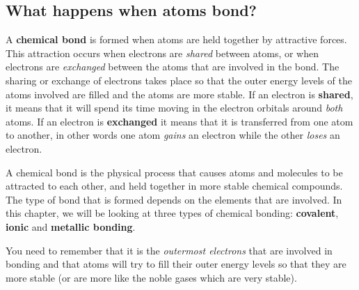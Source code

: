             \subsection*{What happens when atoms bond?}
            \nopagebreak
      \label{m38704*id138842}A \textbf{chemical bond} is formed when atoms are held together by attractive forces. This attraction occurs when electrons are \textsl{shared} between atoms, or when electrons are \textsl{exchanged} between the atoms that are involved in the bond. The sharing or exchange of electrons takes place so that the outer energy levels of the atoms involved are filled and the atoms are more stable. If an electron is \textbf{shared}, it means that it will spend its time moving in the electron orbitals around \textsl{both} atoms. If an electron is \textbf{exchanged} it means that it is transferred from one atom to another, in other words one atom \textsl{gains} an electron while the other \textsl{loses} an electron.\par 
\label{m38704*fhsst!!!underscore!!!id83}
 {\label{m38704*meaningfhsst!!!underscore!!!id83} A chemical bond is the physical process that causes atoms and molecules to be attracted to each other, and held together in more stable chemical compounds.} 
      \label{m38704*id138909}The type of bond that is formed depends on the elements that are involved. In this chapter, we will be looking at three types of chemical bonding: \textbf{covalent}, \textbf{ionic} and \textbf{metallic bonding}.\par 
      \label{m38704*id138929}You need to remember that it is the \textsl{outermost electrons} that are involved in bonding and that atoms will try to fill their outer energy levels so that they are more stable (or are more like the noble gases which are very stable).\par 
